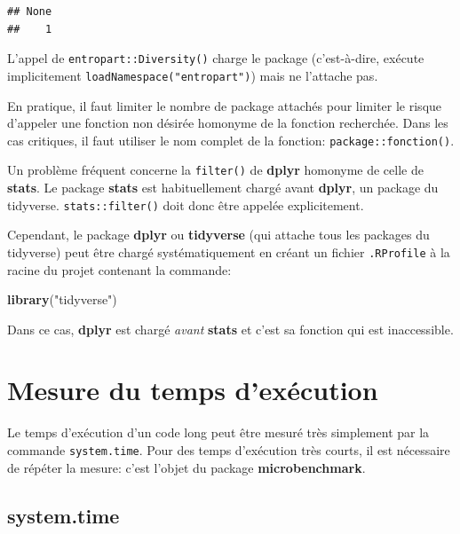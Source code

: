 \documentclass[
  12pt,
  french,
  a4paper,
  extrafontsizes,onecolumn,openright
  ]{memoir}
\newenvironment{Shaded}{\begin{snugshade}}{\end{snugshade}}
\newcommand{\KeywordTok}[1]{\textcolor[rgb]{0.13,0.29,0.53}{\textbf{#1}}}
\newcommand{\NormalTok}[1]{#1}
\newcommand{\StringTok}[1]{\textcolor[rgb]{0.31,0.60,0.02}{#1}}
\begin{document}
\begin{verbatim}
## None 
##    1
\end{verbatim}

\normalsize

L'appel de \texttt{entropart::Diversity()} charge le package (c'est-à-dire, exécute implicitement \texttt{loadNamespace("entropart")}) mais ne l'attache pas.

En pratique, il faut limiter le nombre de package attachés pour limiter le risque d'appeler une fonction non désirée homonyme de la fonction recherchée.
Dans les cas critiques, il faut utiliser le nom complet de la fonction: \texttt{package::fonction()}.

Un problème fréquent concerne la \texttt{filter()} de \textbf{dplyr} homonyme de celle de \textbf{stats}.
Le package \textbf{stats} est habituellement chargé avant \textbf{dplyr}, un package du tidyverse.
\texttt{stats::filter()} doit donc être appelée explicitement.

Cependant, le package \textbf{dplyr} ou \textbf{tidyverse} (qui attache tous les packages du tidyverse) peut être chargé systématiquement en créant un fichier \texttt{.RProfile} à la racine du projet contenant la commande:

\scriptsize

\begin{Shaded}
\begin{Highlighting}[]
\KeywordTok{library}\NormalTok{(}\StringTok{"tidyverse"}\NormalTok{)}
\end{Highlighting}
\end{Shaded}

\normalsize

Dans ce cas, \textbf{dplyr} est chargé \emph{avant} \textbf{stats} et c'est sa fonction qui est inaccessible.

\hypertarget{mesure-du-temps-dexuxe9cution}{%
\section{Mesure du temps d'exécution}\label{mesure-du-temps-dexuxe9cution}}

Le temps d'exécution d'un code long peut être mesuré très simplement par la commande \texttt{system.time}.
Pour des temps d'exécution très courts, il est nécessaire de répéter la mesure: c'est l'objet du package \textbf{microbenchmark}.

\hypertarget{system.time}{%
\subsection{system.time}\label{system.time}}
\end{document}
